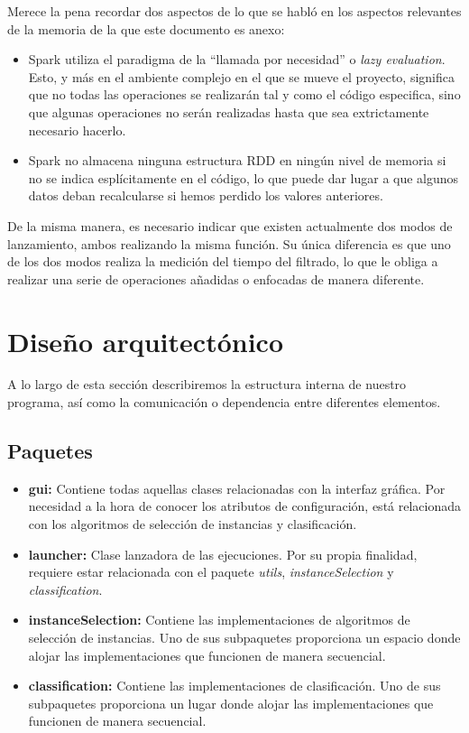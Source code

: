 

Merece la pena recordar dos aspectos de lo que se habló en los aspectos relevantes de la memoria de la que este documento es anexo:
\begin{itemize}
\item Spark utiliza el paradigma de la ``llamada por necesidad'' o \textit{lazy evaluation}. Esto, y más en el ambiente complejo en el que se mueve el proyecto, significa que no todas las operaciones se realizarán tal y como el código especifica, sino que algunas operaciones no serán realizadas hasta que sea extrictamente necesario hacerlo.
\item Spark no almacena ninguna estructura RDD en ningún nivel de memoria si no se indica esplícitamente en el código, lo que puede dar lugar a que algunos datos deban recalcularse si hemos perdido los valores anteriores. 
\end{itemize}

De la misma manera, es necesario indicar que existen actualmente dos modos de lanzamiento, ambos realizando la misma función. Su única diferencia es que uno de los dos modos realiza la medición del tiempo del filtrado, lo que le obliga a realizar una serie de operaciones añadidas o enfocadas de manera diferente.

\section{Diseño arquitectónico}
A lo largo de esta sección describiremos la estructura interna de nuestro programa, así como la comunicación o dependencia entre diferentes elementos.

\subsection{Paquetes}


\begin{itemize}
\item \textbf{gui:} Contiene todas aquellas clases relacionadas con la interfaz gráfica. Por necesidad a la hora de conocer los atributos de configuración, está relacionada con los algoritmos de selección de instancias y clasificación.
\item \textbf{launcher:} Clase lanzadora de las ejecuciones. Por su propia finalidad, requiere estar relacionada con el paquete \textit{utils}, \textit{instanceSelection} y \textit{classification}.
\item \textbf{instanceSelection:} Contiene las implementaciones de algoritmos de selección de instancias. Uno de sus subpaquetes proporciona un espacio donde alojar las implementaciones que funcionen de manera secuencial.
\item \textbf{classification:} Contiene las implementaciones de clasificación. Uno de sus subpaquetes proporciona un lugar donde alojar las implementaciones que funcionen de manera secuencial.
\end{itemize}

